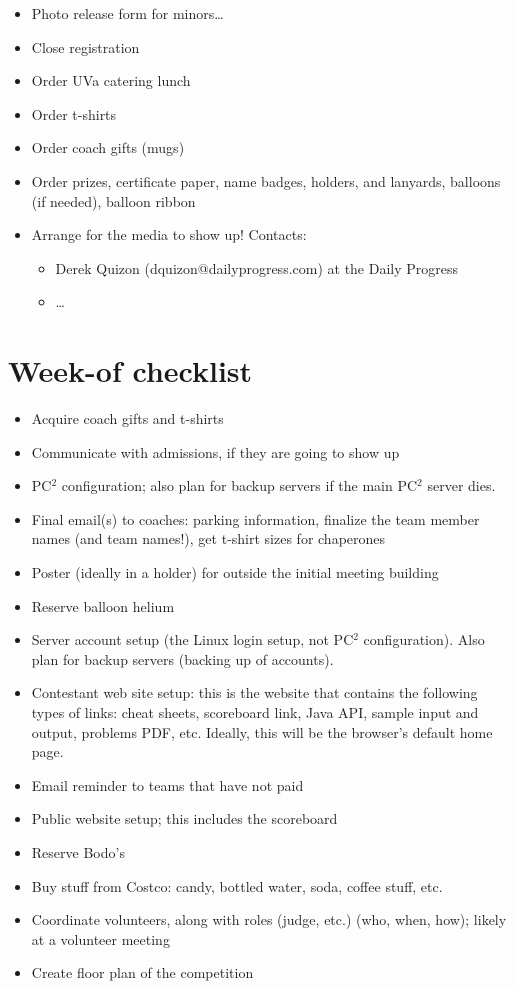 \documentclass[11pt,twoside,letterpaper]{book}
\newenvironment{itemlist}{
\begin{itemize}
\setlength{\itemsep}{0pt}
\setlength{\parskip}{0pt}}
{\end{itemize}}
\begin{document}
\begin{itemlist}
\item Photo release form for minors\ldots
\item Close registration
\item Order UVa catering lunch
\item Order t-shirts
\item Order coach gifts (mugs)
\item Order prizes, certificate paper, name badges, holders, and
  lanyards, balloons (if needed), balloon ribbon
\item Arrange for the media to show up!  Contacts:
  \begin{itemlist}
    \item Derek Quizon (dquizon@dailyprogress.com) at the Daily
      Progress
    \item \ldots
  \end{itemlist}
\end{itemlist}


\section{Week-of checklist}

\begin{itemlist}
\item Acquire coach gifts and t-shirts
\item Communicate with admissions, if they are going to show up
\item PC$^2$ configuration; also plan for backup servers if the main
  PC$^2$ server dies.
\item Final email(s) to coaches: parking information, finalize the
  team member names (and team names!), get t-shirt sizes for
  chaperones
\item Poster (ideally in a holder) for outside the initial meeting
  building
\item Reserve balloon helium
\item Server account setup (the Linux login setup, not PC$^2$
  configuration).  Also plan for backup servers (backing up of
  accounts).
\item Contestant web site setup: this is the website that contains the
  following types of links: cheat sheets, scoreboard link, Java API,
  sample input and output, problems PDF, etc.  Ideally, this will be
  the browser's default home page.
\item Email reminder to teams that have not paid
\item Public website setup; this includes the scoreboard
\item Reserve Bodo's
\item Buy stuff from Costco: candy, bottled water, soda, coffee stuff,
  etc.
\item Coordinate volunteers, along with roles (judge, etc.) (who,
  when, how); likely at a volunteer meeting
\item Create floor plan of the competition
\end{itemlist}
\end{document}
